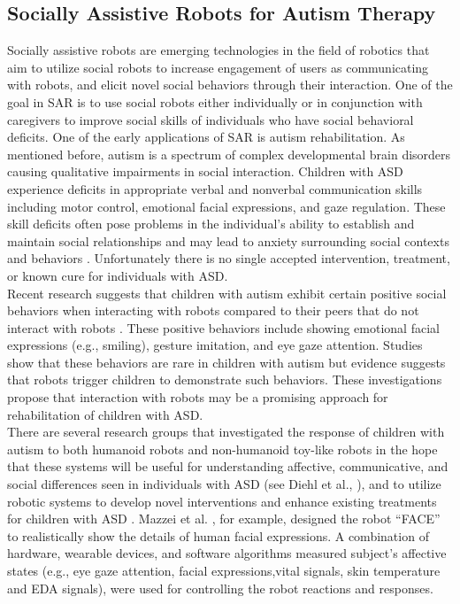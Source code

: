 \subsection{Socially Assistive Robots for Autism Therapy}
Socially assistive robots are emerging technologies in the field of robotics that aim
to utilize social robots to increase engagement of users as communicating with robots, and
elicit novel social behaviors through their interaction. One of the goal in SAR is to use
social robots either individually or in conjunction with caregivers to improve social skills
of individuals who have social behavioral deficits. One of the early applications of SAR is
autism rehabilitation. As mentioned before, autism is a spectrum of complex
developmental brain disorders causing qualitative impairments in social interaction.
Children with ASD experience deficits in appropriate verbal and nonverbal communication
skills including motor control, emotional facial expressions, and gaze regulation. These
skill deficits often pose problems in the individual’s ability to establish and maintain social
relationships and may lead to anxiety surrounding social contexts and behaviors \cite{Behavioral1964}.
Unfortunately there is no single accepted intervention, treatment, or known cure for
individuals with ASD.\\

Recent research suggests that children with autism exhibit certain positive social
behaviors when interacting with robots compared to their peers that do not interact with
robots \cite{RobotMovement, EnhanceEmpiri2011, DOMER2011, DefineSocial2005, SocialInteract2003}. 
These positive behaviors include showing emotional facial
expressions (e.g., smiling), gesture imitation, and eye gaze attention. Studies show that
these behaviors are rare in children with autism but evidence suggests that robots trigger
children to demonstrate such behaviors. These investigations propose that interaction with
robots may be a promising approach for rehabilitation of children with ASD.\\

There are several research groups that investigated the response of children with
autism to both humanoid robots and non-humanoid toy-like robots in the hope that these
systems will be useful for understanding affective, communicative, and social differences
seen in individuals with ASD (see Diehl et al., \cite{SocialInteract2003}), and to utilize robotic systems to develop
novel interventions and enhance existing treatments for children with ASD \cite{ASIMO2011, DSMIV2000, DoesMatter2006}.
Mazzei et al. \cite{ToInteract2004}, for example, designed the robot “FACE” to realistically show the details
of human facial expressions. A combination of hardware, wearable devices, and software
algorithms measured subject’s affective states (e.g., eye gaze attention, facial expressions,vital signals, 
skin temperature and EDA signals), were used for controlling the robot
reactions and responses.\\

